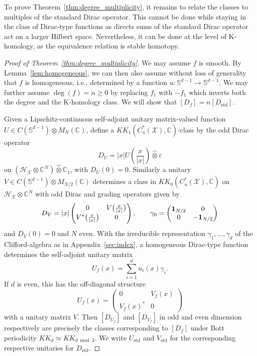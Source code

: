 \documentclass[12pt]{amsart}
\newcommand{\CM}{{\mathbb C}}
\newcommand{\SM}{{\mathbb S}}
\newcommand{\Hh}{{\mathcal H}}
\newcommand{\Xx}{{\mathcal X}}
\newcommand{\one}{{\bf 1}}
\newcommand{\ep}{\varepsilon}
\begin{document}
To prove Theorem~\ref{thm:degree_multiplicity}, it remains to relate the classes to multiples of the standard Dirac operator. This cannot be done while staying in the class of Dirac-type functions as directs sums of the standard Dirac operator act on a larger Hilbert space. 
Nevertheless, it can be done at the level of K-homology, as the equivalence relation is stable homotopy.


\begin{proof}[Proof of Theorem~\ref{thm:degree_multiplicity}]
We may assume $f$ is smooth. By Lemma~\ref{lem:homogeneous}, we can then also assume without loss of generality that $f$ is homogeneous, i.e., determined by a function  $u: \SM^{d-1}\to \SM^{d-1}$. 
We may further assume $\deg(f) = n \geq 0$ by replacing $f_1$ with $-f_1$ which inverts both the degree and the K-homology class. We will show that $[D_f]=n[D_{\mathrm{std}}]$.


 Given a Lipschitz-continuous self-adjoint unitary matrix-valued function $U\in C(\SM^{d-1})\otimes M_{N}(\CM)$, define a $KK_1(C^*_u(\Xx),\CM)$-class by the odd Dirac operator
$$D_U = |x|U\left(\frac{x}{|x|}\right)\hat{\otimes}\ep$$
on $(\Hh_\Xx\otimes \CM^N)\hat{\otimes}\CM_1$, with $D_U(0)=0$. Similarly a unitary $V\in C(\SM^{d-1})\otimes M_{N/2}(\CM)$ determines a class in $KK_0(C^*_u(\Xx),\CM)$ on $\Hh_\Xx\otimes \CM^N$ with odd Dirac and grading operators given by
$$D_V = |x| \begin{pmatrix}
    0 & V\bigl(\frac{x}{|x|}\bigr)\\
    V^*\bigl(\frac{x}{|x|}\bigr) & 0
\end{pmatrix}, \qquad \gamma_0 =  \begin{pmatrix}
    \one_{N/2} & 0\\
    0 &  -\one_{N/2}
\end{pmatrix}$$
and $D_V(0)=0$ and $N$ even.
With the irreducible representation $\gamma_1,\ldots,\gamma_d$ of the Clifford-algebra as in Appendix~\ref{sec:index}, a homogeneous Dirac-type function determines the self-adjoint unitary matrix
$$U_f(x) = \sum_{i=1}^d  u_i(x) \gamma_i.$$
If $d$ is even, this has the off-diagonal structure
$$U_f(x) = \begin{pmatrix}
0 & V_f(x) \\ V_f(x)^* & 0
\end{pmatrix}$$
with a unitary matrix $V$. Then $[D_{U_f}]$ and $[D_{V_f}]$ in odd and even dimension respectively are precisely the classes corresponding to $[D_f]$ under Bott periodicity $KK_d \simeq KK_{d\bmod 2}$. 
We write $U_{\mathrm{std}}$ and $V_{\mathrm{std}}$ for the corresponding respective unitaries for $D_{\mathrm{std}}$.


\end{proof}
\end{document}
